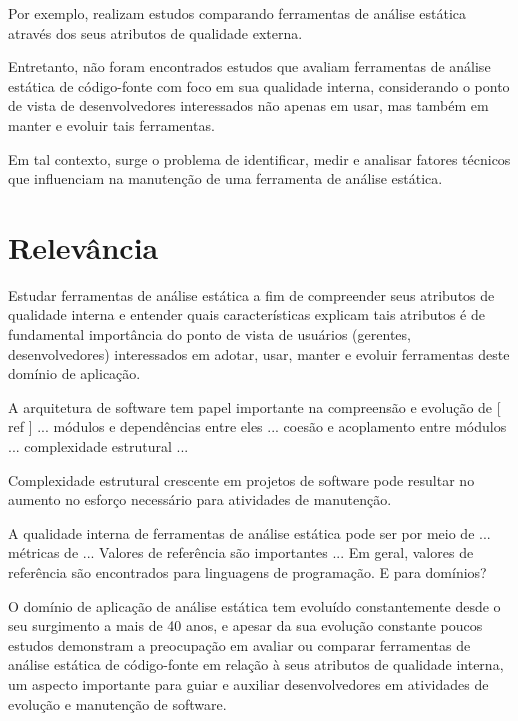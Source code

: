 Por exemplo, \cite{Rutar2004} \cite{Kratkiewicz2005} \cite{Okun2007}
\cite{Emanuelsson2008} \cite{Wedyan2009} \cite{Mantere2009} \cite{Al2010}
\cite{Li2010} \cite{Johns2011} \cite{Alemerien2013} \cite{Ataide2014} realizam
estudos comparando ferramentas de análise estática através dos seus atributos
de qualidade externa.

Entretanto, não foram encontrados estudos que avaliam 
ferramentas de análise estática de código-fonte 
com foco em sua qualidade interna, 
considerando o ponto de vista de desenvolvedores interessados 
não apenas em usar, mas também em manter e evoluir tais ferramentas.

Em tal contexto, surge o problema de identificar, medir e analisar fatores
técnicos que influenciam na manutenção de uma ferramenta de análise estática. 

\section{Relevância}

Estudar ferramentas de análise estática a fim de compreender seus atributos de
qualidade interna e entender quais características %
explicam tais atributos é de fundamental importância do 
ponto de vista de usuários (gerentes, desenvolvedores) interessados
em adotar, usar, manter e evoluir ferramentas deste domínio de aplicação.

A arquitetura de software tem papel importante na compreensão e evolução 
de [ ref ] ...
módulos e dependências entre eles ... coesão e acoplamento entre módulos ...
complexidade estrutural ...
 
Complexidade estrutural crescente em projetos de software pode resultar
no aumento no esforço necessário para atividades de manutenção.

A qualidade interna de ferramentas de análise estática pode ser 
por meio de ... métricas de ... 
Valores de referência são importantes ...
Em geral, valores de referência são encontrados para linguagens de programação.
E para domínios?


O domínio de aplicação de análise estática tem evoluído constantemente desde o
seu surgimento a mais de 40 anos, e apesar da sua evolução constante poucos
estudos demonstram a preocupação em avaliar ou comparar ferramentas de análise
estática de código-fonte em relação à seus atributos de qualidade interna, um
aspecto importante para guiar e auxiliar desenvolvedores em atividades de
evolução e manutenção de software.

